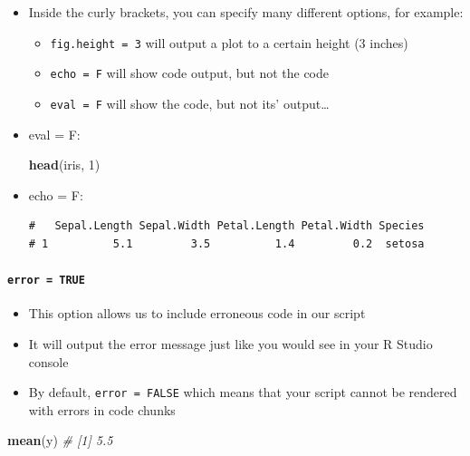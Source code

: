 \documentclass[
]{book}
\newenvironment{Shaded}{\begin{snugshade}}{\end{snugshade}}
\newcommand{\CommentTok}[1]{\textcolor[rgb]{0.56,0.35,0.01}{\textit{#1}}}
\newcommand{\DecValTok}[1]{\textcolor[rgb]{0.00,0.00,0.81}{#1}}
\newcommand{\FunctionTok}[1]{\textcolor[rgb]{0.13,0.29,0.53}{\textbf{#1}}}
\newcommand{\NormalTok}[1]{#1}
\providecommand{\tightlist}{%
  \setlength{\itemsep}{0pt}\setlength{\parskip}{0pt}}
\begin{document}
\begin{itemize}
\item
  Inside the curly brackets, you can specify many different options, for example:

  \begin{itemize}
  \tightlist
  \item
    \texttt{fig.height\ =\ 3} will output a plot to a certain height (3 inches)
  \item
    \texttt{echo\ =\ F} will show code output, but not the code
  \item
    \texttt{eval\ =\ F} will show the code, but not its' output\ldots{}
  \end{itemize}
\item
  eval = F:

\begin{Shaded}
\begin{Highlighting}[]
\FunctionTok{head}\NormalTok{(iris, }\DecValTok{1}\NormalTok{) }
\end{Highlighting}
\end{Shaded}
\item
  echo = F:

\begin{verbatim}
#   Sepal.Length Sepal.Width Petal.Length Petal.Width Species
# 1          5.1         3.5          1.4         0.2  setosa
\end{verbatim}
\end{itemize}

\paragraph*{\texorpdfstring{\texttt{error\ =\ TRUE}}{error = TRUE}}\label{error-true}

\begin{itemize}
\tightlist
\item
  This option allows us to include erroneous code in our script
\item
  It will output the error message just like you would see in your R Studio console
\item
  By default, \texttt{error\ =\ FALSE} which means that your script cannot be rendered with errors in code chunks
\end{itemize}

\begin{Shaded}
\begin{Highlighting}[]
\FunctionTok{mean}\NormalTok{(y)}
\CommentTok{\# [1] 5.5}
\end{Highlighting}
\end{Shaded}
\end{document}
